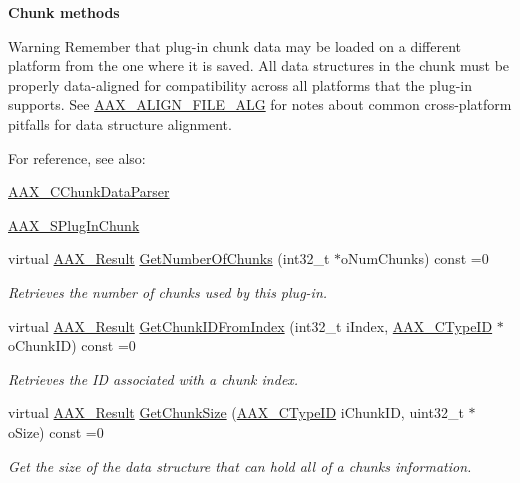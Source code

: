\begin{Indent}{\bf Chunk methods}
{\begin{DoxyWarning}{Warning}
Remember that plug-\/in chunk data may be loaded on a different platform from the one where it is saved. All data structures in the chunk must be properly data-\/aligned for compatibility across all platforms that the plug-\/in supports. See \hyperlink{a00149_a8fbeac3c5db5ac694e85a021ed74dc9e}{A\+A\+X\+\_\+\+A\+L\+I\+G\+N\+\_\+\+F\+I\+L\+E\+\_\+\+A\+L\+G} for notes about common cross-\/platform pitfalls for data structure alignment.
\end{DoxyWarning}
For reference, see also\+: \begin{DoxyItemize}
\item \hyperlink{a00014}{A\+A\+X\+\_\+\+C\+Chunk\+Data\+Parser} \item \hyperlink{a00125}{A\+A\+X\+\_\+\+S\+Plug\+In\+Chunk} \end{DoxyItemize}
}\begin{DoxyCompactItemize}
\item 
virtual \hyperlink{a00149_a4d8f69a697df7f70c3a8e9b8ee130d2f}{A\+A\+X\+\_\+\+Result} \hyperlink{a00061_a37e546c6dbb4d5a16fedb9f465de2599}{Get\+Number\+Of\+Chunks} (int32\+\_\+t $\ast$o\+Num\+Chunks) const =0
\begin{DoxyCompactList}\small\item\em Retrieves the number of chunks used by this plug-\/in. \end{DoxyCompactList}\item 
virtual \hyperlink{a00149_a4d8f69a697df7f70c3a8e9b8ee130d2f}{A\+A\+X\+\_\+\+Result} \hyperlink{a00061_a10409113cb781002551b878e4c0edd5a}{Get\+Chunk\+I\+D\+From\+Index} (int32\+\_\+t i\+Index, \hyperlink{a00149_ac678f9c1fbcc26315d209f71a147a175}{A\+A\+X\+\_\+\+C\+Type\+I\+D} $\ast$o\+Chunk\+I\+D) const =0
\begin{DoxyCompactList}\small\item\em Retrieves the I\+D associated with a chunk index. \end{DoxyCompactList}\item 
virtual \hyperlink{a00149_a4d8f69a697df7f70c3a8e9b8ee130d2f}{A\+A\+X\+\_\+\+Result} \hyperlink{a00061_aa986711cd372febcaae803e86ae08f63}{Get\+Chunk\+Size} (\hyperlink{a00149_ac678f9c1fbcc26315d209f71a147a175}{A\+A\+X\+\_\+\+C\+Type\+I\+D} i\+Chunk\+I\+D, uint32\+\_\+t $\ast$o\+Size) const =0
\begin{DoxyCompactList}\small\item\em Get the size of the data structure that can hold all of a chunk\textquotesingle{}s information. \end{DoxyCompactList}\item 

\end{DoxyCompactItemize}
\end{Indent}
